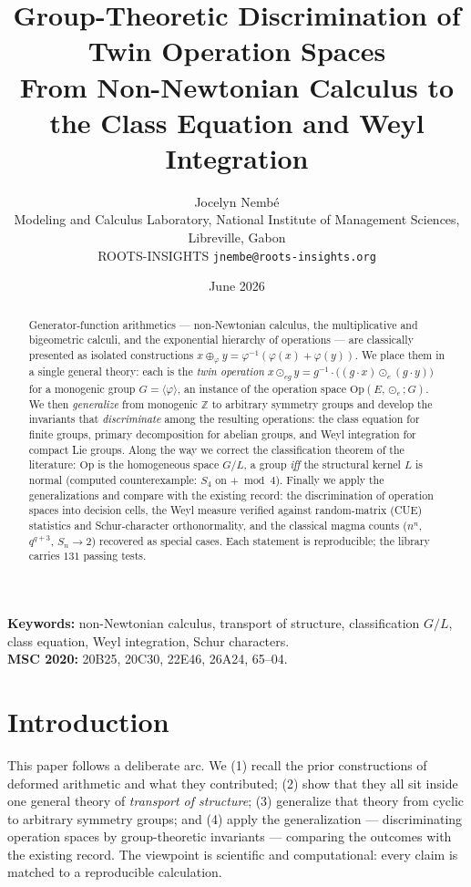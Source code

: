 \documentclass[11pt,a4paper]{article}
\title{\textbf{Group-Theoretic Discrimination of Twin Operation Spaces}\\[0.3em]
\large From Non-Newtonian Calculus to the Class Equation and Weyl Integration}
\author{Jocelyn Nemb\'e\\
\small Modeling and Calculus Laboratory, National Institute of Management
Sciences, Libreville, Gabon\\
\small ROOTS-INSIGHTS \quad\textbar\quad \texttt{jnembe@roots-insights.org}}
\date{June 2026}
\newcommand{\Op}{\mathrm{Op}}
\newcommand{\Z}{\mathbb{Z}}
\theoremstyle{plain}
\theoremstyle{definition}
\theoremstyle{remark}
\begin{document}
\maketitle

\begin{abstract}
\noindent
Generator-function arithmetics --- non-Newtonian calculus, the multiplicative
and bigeometric calculi, and the exponential hierarchy of operations --- are
classically presented as isolated constructions
$x\oplus_\varphi y=\varphi^{-1}(\varphi(x)+\varphi(y))$. We place them in a
single general theory: each is the \emph{twin operation}
$x\odot_{eg}y=g^{-1}\!\cdot\!\bigl((g\cdot x)\odot_e(g\cdot y)\bigr)$ for a
monogenic group $G=\langle\varphi\rangle$, an instance of the operation space
$\Op(E,\odot_e;G)$. We then \emph{generalize} from monogenic $\Z$ to arbitrary
symmetry groups and develop the invariants that \emph{discriminate} among the
resulting operations: the class equation for finite groups, primary
decomposition for abelian groups, and Weyl integration for compact Lie groups.
Along the way we correct the classification theorem of the literature: $\Op$ is
the homogeneous space $G/L$, a group \emph{iff} the structural kernel $L$ is
normal (computed counterexample: $S_4$ on $+\bmod 4$). Finally we apply the
generalizations and compare with the existing record: the discrimination of
operation spaces into decision cells, the Weyl measure verified against
random-matrix (CUE) statistics and Schur-character orthonormality, and the
classical magma counts ($n^n$, $q^{q+3}$, $S_n\!\to\!2$) recovered as special
cases. Each statement is reproducible; the library carries $131$ passing tests.
\end{abstract}

\noindent\textbf{Keywords:} non-Newtonian calculus, transport of structure,
classification $G/L$, class equation, Weyl integration, Schur characters.\\
\textbf{MSC 2020:} 20B25, 20C30, 22E46, 26A24, 65--04.

\section{Introduction}

This paper follows a deliberate arc. We (1) recall the prior constructions of
deformed arithmetic and what they contributed; (2) show that they all sit inside
one general theory of \emph{transport of structure}; (3) generalize that theory
from cyclic to arbitrary symmetry groups; and (4) apply the generalization ---
discriminating operation spaces by group-theoretic invariants --- comparing the
outcomes with the existing record. The viewpoint is scientific and
computational: every claim is matched to a reproducible calculation.
\end{document}
